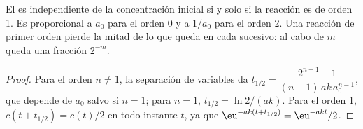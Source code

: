 \begin{proposition}\label{prop:b1:rate-laws:half-life-test}
El  es independiente de la concentración inicial
si y solo si la reacción es de orden 1. Es proporcional a $a_0$ para el
orden 0 y a $1/a_0$ para el orden 2. Una reacción de primer orden pierde
la mitad de lo que queda en cada  sucesivo: al
cabo de $m$  queda una fracción $2^{-m}$.
\end{proposition}

\begin{proof}
Para el orden $n \ne 1$, la separación de variables da $t_{1/2} = \dfrac{2^{n-1} -
1}{(n-1)\,ak\,a_0^{n-1}}$, que depende de $a_0$ salvo si $n = 1$; para
$n = 1$, $t_{1/2} = \ln2/(ak)$. Para el orden 1, $c(t + t_{1/2}) = c(t)/2$
en todo instante $t$, ya que $\eu^{-ak(t + t_{1/2})} = \eu^{-akt}/2$.
\end{proof}

